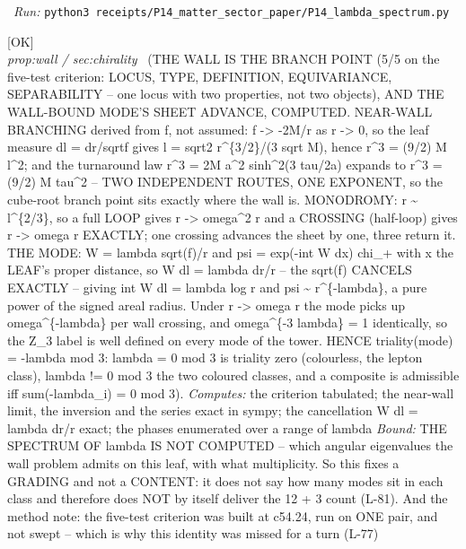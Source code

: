 \begin{description}
\ \emph{Run:} \texttt{python3 receipts/P14\_matter\_sector\_paper/P14\_lambda\_spectrum.py}
\item[\label{rcpt:P14_mode_monodromy_at_the_wall}\texttt{P14\_mode\_monodromy\_at\_the\_wall}]\hfill\textsf{[OK]}\\
\textit{prop:wall / sec:chirality} \ (THE WALL IS THE BRANCH POINT (5/5 on the five-test criterion: LOCUS, TYPE, DEFINITION, EQUIVARIANCE, SEPARABILITY -- one locus with two properties, not two objects), AND THE WALL-BOUND MODE'S SHEET ADVANCE, COMPUTED. NEAR-WALL BRANCHING derived from f, not assumed: f -> -2M/r as r -> 0, so the leaf measure dl = dr/sqrt\textbar{}f\textbar{} gives l = sqrt2 r\textasciicircum{}\{3/2\}/(3 sqrt M), hence r\textasciicircum{}3 = (9/2) M l\textasciicircum{}2; and the turnaround law r\textasciicircum{}3 = 2M a\textasciicircum{}2 sinh\textasciicircum{}2(3 tau/2a) expands to r\textasciicircum{}3 = (9/2) M tau\textasciicircum{}2 -- TWO INDEPENDENT ROUTES, ONE EXPONENT, so the cube-root branch point sits exactly where the wall is. MONODROMY: r \textasciitilde{} l\textasciicircum{}\{2/3\}, so a full LOOP gives r -> omega\textasciicircum{}2 r and a CROSSING (half-loop) gives r -> omega r EXACTLY; one crossing advances the sheet by one, three return it. THE MODE: W = lambda sqrt(f)/r and psi = exp(-int W dx) chi\_+ with x the LEAF's proper distance, so W dl = lambda dr/r -- the sqrt(f) CANCELS EXACTLY -- giving int W dl = lambda log r and psi \textasciitilde{} r\textasciicircum{}\{-lambda\}, a pure power of the signed areal radius. Under r -> omega r the mode picks up omega\textasciicircum{}\{-lambda\} per wall crossing, and omega\textasciicircum{}\{-3 lambda\} = 1 identically, so the Z\_3 label is well defined on every mode of the tower. HENCE triality(mode) = -lambda mod 3: lambda = 0 mod 3 is triality zero (colourless, the lepton class), lambda != 0 mod 3 the two coloured classes, and a composite is admissible iff sum(-lambda\_i) = 0 mod 3). 
\emph{Computes:} the criterion tabulated; the near-wall limit, the inversion and the series exact in sympy; the cancellation W dl = lambda dr/r exact; the phases enumerated over a range of lambda
 \emph{Bound:} THE SPECTRUM OF lambda IS NOT COMPUTED -- which angular eigenvalues the wall problem admits on this leaf, with what multiplicity. So this fixes a GRADING and not a CONTENT: it does not say how many modes sit in each class and therefore does NOT by itself deliver the 12 + 3 count (L-81). And the method note: the five-test criterion was built at c54.24, run on ONE pair, and not swept -- which is why this identity was missed for a turn (L-77)

\end{description}
